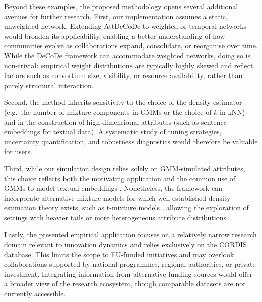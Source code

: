 \documentclass[11pt]{article}
\begin{document}

Beyond these examples, the proposed methodology opens several additional avenues for further research. First, our implementation assumes a static, unweighted network. Extending AttDeCoDe to weighted or temporal networks \citep{Balland2019Network20032017, Morea2024MappingAnalysis} would broaden its applicability, enabling a better understanding of how communities evolve as collaborations expand, consolidate, or reorganise over time.
While the DeCoDe framework can accommodate weighted networks, doing so is non-trivial: empirical weight distributions are typically highly skewed and reflect factors such as consortium size, visibility, or resource availability, rather than purely structural interaction.

Second, the method inherits sensitivity to the choice of the density estimator (e.g.\ the number of mixture components in GMMs or the choice of $k$ in kNN) and in the construction of high-dimensional attributes (such as sentence embeddings for textual data). A systematic study of tuning strategies, uncertainty quantification, and robustness diagnostics would therefore be valuable for users. 

Third, while our simulation design relies solely on GMM-simulated attributes, this choice reflects both the motivating application and the common use of GMMs to model textual embeddings \citep{clinchant2013}.
Nonetheless, the framework can incorporate alternative mixture models for which well-established density estimation theory exists, such as t-mixture models \cite{McLachlan2005}, allowing the exploration of settings with heavier tails or more heterogeneous attribute distributions. 

Lastly, the presented empirical application focuses on a relatively narrow research domain relevant to innovation dynamics and relies exclusively on the CORDIS database. This limits the scope to EU-funded initiatives and may overlook collaborations supported by national programmes, regional authorities, or private investment. Integrating information from alternative funding sources would offer a broader view of the research ecosystem, though comparable datasets are not currently accessible.
\end{document}
